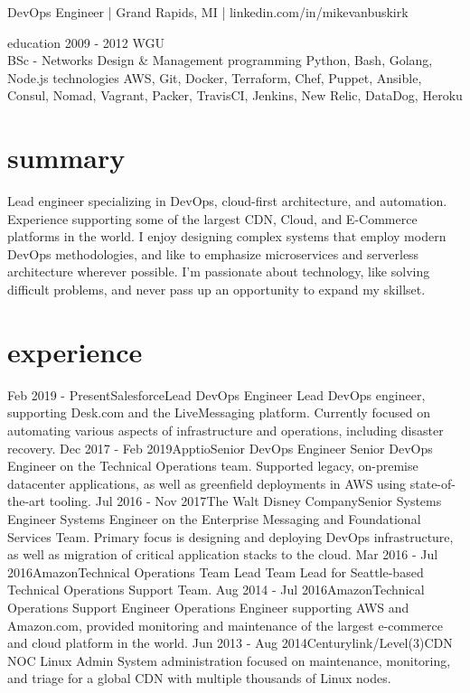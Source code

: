 \documentclass[]{mv_cv}
\begin{document}
       {DevOps Engineer | Grand Rapids, MI | linkedin.com/in/mikevanbuskirk} 
 
\begin{sidebar}
 \sideitem
 {education}
 {2009 - 2012 WGU\\BSc - Networks Design \& Management}
 \sideitem
 {programming}
 {Python, Bash, Golang, Node.js}
 \sideitem
 {technologies}
 {AWS, Git, Docker,
 Terraform, Chef,
 Puppet, Ansible,
 Consul, Nomad,
 Vagrant, Packer,
 TravisCI, Jenkins,
 New Relic, DataDog, Heroku}
\end{sidebar}

\section{summary}
\begin{content}
  {Lead engineer specializing in DevOps, cloud-first architecture, and automation.
  Experience supporting some of the largest CDN, Cloud, and E-Commerce platforms in the world.
  I enjoy designing complex systems that employ modern DevOps methodologies, and like to emphasize microservices and serverless architecture wherever possible.
  I'm passionate about technology, like solving difficult problems, and never pass up an opportunity to expand my skillset.}
\end{content}

\section{experience}
  \begin{explist}
    \expitem
    {Feb 2019 - Present}{Salesforce}{Lead DevOps Engineer}
    {Lead DevOps engineer, supporting Desk.com and the LiveMessaging platform. Currently focused on automating various aspects of infrastructure and operations, including disaster recovery.}
    \expitem
    {Dec 2017 - Feb 2019}{Apptio}{Senior DevOps Engineer}
    {Senior DevOps Engineer on the Technical Operations team. Supported legacy, on-premise datacenter applications, as well as greenfield deployments in AWS using state-of-the-art tooling.}
    \expitem
    {Jul 2016 - Nov 2017}{The Walt Disney Company}{Senior Systems Engineer}
    {Systems Engineer on the Enterprise Messaging and Foundational Services Team. Primary focus is designing and deploying DevOps infrastructure, as well as migration of critical application stacks to the cloud.}
    \expitem
    {Mar 2016 - Jul 2016}{Amazon}{Technical Operations Team Lead}
    {Team Lead for Seattle-based Technical Operations Support Team.}
    \expitem
    {Aug 2014 - Jul 2016}{Amazon}{Technical Operations Support Engineer}
    {Operations Engineer supporting AWS and Amazon.com, provided monitoring and maintenance of the largest e-commerce and cloud platform in the world.}
   \expitem
    {Jun 2013 - Aug 2014}{Centurylink/Level(3)}{CDN NOC Linux Admin}
    {System administration focused on maintenance, monitoring, and triage for a global CDN with multiple thousands of Linux nodes.}
  \end{explist}

\thispagestyle{empty}
\end{document}
